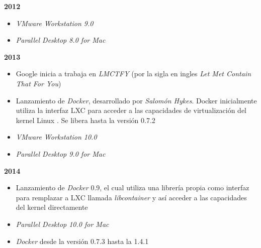 \textbf{2012}\\
\begin{itemize}
	\item \textit{VMware Workstation 9.0}\\
	
	\item \textit{Parallel Desktop 8.0 for Mac}\\	
\end{itemize}

\textbf{2013}\\

\begin{itemize}
	\item Google inicia a trabaja en \textit{LMCTFY} (por la sigla en ingles \textit{Let Met Contain That For You})\\
	
	\item Lanzamiento de \textit{Docker}, desarrollado por \textit{Salomón Hykes}. Docker inicialmente utiliza la interfaz LXC para acceder a las capacidades de virtualización del kernel Linux \parencite{Turnbull2014}.  Se libera hasta la versión 0.7.2\\
	
	\item \textit{VMware Workstation 10.0}\\
	
	\item \textit{Parallel Desktop 9.0 for Mac}\\	
	
\end{itemize}

\textbf{2014}\\
\begin{itemize}
	\item Lanzamiento de \textit{Docker} 0.9, el cual utiliza una librería propia como interfaz para remplazar a LXC llamada \textit{libcontainer} y así acceder a las capacidades del kernel directamente \parencite{Kurtzer2017}\\
	
	\item \textit{Parallel Desktop 10.0 for Mac}\\	
	
	\item \textit{Docker} desde la versión 0.7.3 hasta la 1.4.1
	
\end{itemize}


